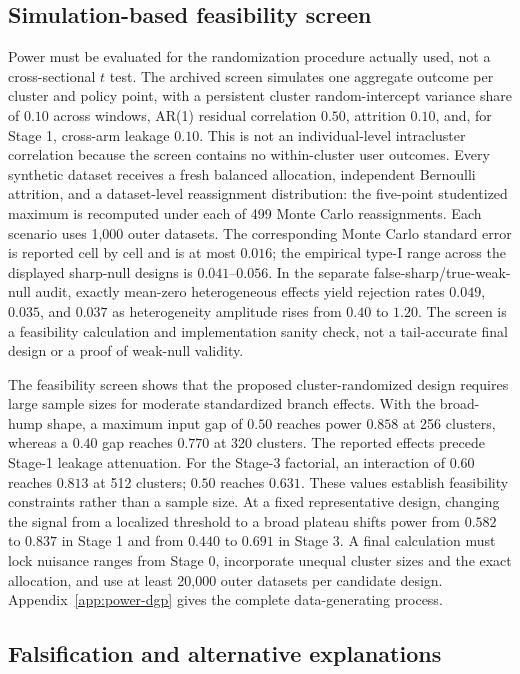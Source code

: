 \documentclass[pdflatex,sn-mathphys-num]{sn-jnl}
\begin{document}
\subsection{Simulation-based feasibility screen}

Power must be evaluated for the randomization procedure actually used, not a cross-sectional $t$ test. The archived screen simulates one aggregate outcome per cluster and policy point, with a persistent cluster random-intercept variance share of $0.10$ across windows, AR(1) residual correlation $0.50$, attrition $0.10$, and, for Stage 1, cross-arm leakage $0.10$. This is not an individual-level intracluster correlation because the screen contains no within-cluster user outcomes. Every synthetic dataset receives a fresh balanced allocation, independent Bernoulli attrition, and a dataset-level reassignment distribution: the five-point studentized maximum is recomputed under each of 499 Monte Carlo reassignments. Each scenario uses 1,000 outer datasets. The corresponding Monte Carlo standard error is reported cell by cell and is at most $0.016$; the empirical type-I range across the displayed sharp-null designs is $0.041$--$0.056$. In the separate false-sharp/true-weak-null audit, exactly mean-zero heterogeneous effects yield rejection rates $0.049$, $0.035$, and $0.037$ as heterogeneity amplitude rises from $0.40$ to $1.20$. The screen is a feasibility calculation and implementation sanity check, not a tail-accurate final design or a proof of weak-null validity.

The feasibility screen shows that the proposed cluster-randomized design requires large sample sizes for moderate standardized branch effects. With the broad-hump shape, a maximum input gap of $0.50$ reaches power $0.858$ at 256 clusters, whereas a $0.40$ gap reaches $0.770$ at 320 clusters. The reported effects precede Stage-1 leakage attenuation. For the Stage-3 factorial, an interaction of $0.60$ reaches $0.813$ at 512 clusters; $0.50$ reaches $0.631$. These values establish feasibility constraints rather than a sample size. At a fixed representative design, changing the signal from a localized threshold to a broad plateau shifts power from $0.582$ to $0.837$ in Stage 1 and from $0.440$ to $0.691$ in Stage 3. A final calculation must lock nuisance ranges from Stage 0, incorporate unequal cluster sizes and the exact allocation, and use at least 20,000 outer datasets per candidate design. Appendix~\ref{app:power-dgp} gives the complete data-generating process.

\subsection{Falsification and alternative explanations}
\end{document}
